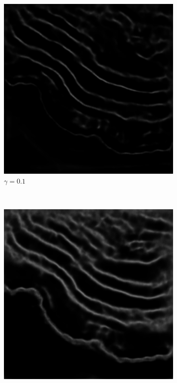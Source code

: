 \begin{figure}[t]
    \centering
    \begin{subfigure}[t]{0.32\textwidth}
        \centering
        \includegraphics[width=1\textwidth, valign=c]{images/focal_g01.png}
        \caption{$\gamma=0.1$}
    \end{subfigure}
    ~
    \begin{subfigure}[t]{0.32\textwidth}
        \centering
        \includegraphics[width=1\textwidth, valign=c]{images/focal_g2.png}

\end{subfigure}
\end{figure}
